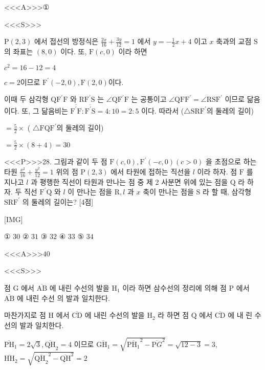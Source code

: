 \documentclass{oblivoir}
\begin{document}
<<<A>>>①

<<<S>>>



$ \mathrm{P}(2,3)$ 에서 접선의 방정식은 $\frac{2 x}{16}+\frac{3 y}{12}=1$ 에서 $y=-\frac{1}{2} x+4$ 이고 $x$ 축과의 교점 $\mathrm{S}$ 의 좌표는 $(8,0)$ 이다.
또, $\mathrm{F}(c, 0)$ 이라 하면

$c^{2}=16-12=4$

$c=2$이므로 $\mathrm{F}^{\prime}(-2,0), \mathrm{F}(2,0)$이다.

이때 두 삼각형 $\mathrm{QF}^{\prime} \mathrm{F}$ 와 $\mathrm{RF}^{\prime} \mathrm{S}$ 는 $\angle \mathrm{QF}^{\prime} \mathrm{F}$ 는 공통이고 $\angle \mathrm{QFF}^{\prime}=\angle \mathrm{RSF}^{\prime}$ 이므로 닮음이다.
또, 그 닮음비는 $\overline{\mathrm{F}^{\prime} \mathrm{F}}: \overline{\mathrm{F}^{\prime} \mathrm{S}}=4: 10=2: 5$ 이다.
따라서 ($\triangle \mathrm{SRF}^{\prime}$의 둘레의 길이)

$=\frac{5}{2} \times$ ( $\triangle \mathrm{FQF}^{\prime}$의 둘레의 길이)

$=\frac{5}{2} \times(8+4)=30$


<<<P>>>28. 그림과 같이 두 점 $\mathrm{F}(c, 0), \mathrm{F}^{\prime}(-c, 0)(c>0)$ 을 초점으로 하는 타원 $\frac{x^{2}}{16}+\frac{y^{2}}{12}=1$ 위의 점 $\mathrm{P}(2,3)$ 에서 타원에 접하는 직선을 $l$ 이라 하자. 점 $\mathrm{F}$ 를 지나고 $l$ 과 평행한 직선이 타원과 만나는 점 중 제 2 사분면 위에 있는 점을 $\mathrm{Q}$ 라 하자. 두 직선 $\mathrm{F}^{\prime} \mathrm{Q}$ 와 $l$ 이 만나는 점을 $\mathrm{R}, l$ 과 $x$ 축이 만나는 점을 $\mathrm{S}$ 라 할 때, 삼각형 $\mathrm{SRF}^{\prime}$ 의 둘레의 길이는? [4점]


[IMG]

① $30$
② $31$
③ $32$
④ $33$
⑤ $34$



<<<A>>>$40$

<<<S>>>



점 $\mathrm{G}$ 에서 $\overline{\mathrm{AB}}$ 에 내린 수선의 발을 $\mathrm{H}_{1}$ 이라 하면 삼수선의 정리에 의해 점 $\mathrm{P}$ 에서 $\overline{\mathrm{AB}}$ 에 내린 수선 의 발과 일치한다.

마찬가지로 점 $\mathrm{H}$ 에서 $\overline{\mathrm{CD}}$ 에 내린 수선의 발을 $\mathrm{H}_{2}$ 라 하면 점 $\mathrm{Q}$ 에서 $\overline{\mathrm{CD}}$ 에 내 린 수선의 발과 일치한다.

$\overline{\mathrm{PH}}_{1}=2 \sqrt{3}, \overline{\mathrm{QH}}_{2}=4$ 이므로
$\overline{\mathrm{GH}_{1}}=\sqrt{\overline{\mathrm{PH}_{1}}^{2}-\overline{\mathrm{P} G}^{2}}=\sqrt{12-3}=3$,
$\overline{\mathrm{HH}}_{2}=\sqrt{\overline{\mathrm{QH}_{2}}^{2}-\overline{\mathrm{QH}}^{2}}=2$
\end{document}
